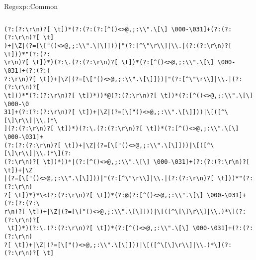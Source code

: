 \documentclass[14pt]{beamer}
\begin{document}
\begin{frame}[fragile]
    Regexp::Common
    \lstset{language=Perl}
    \begin{lstlisting}
    \end{lstlisting}
\end{frame}

\begin{frame}[fragile]
    \lstset{basicstyle=\tiny,language=Perl}
    \begin{lstlisting}
(?:(?:\r\n)?[ \t])*(?:(?:(?:[^()<>@,;:\\".\[\] \000-\031]+(?:(?:(?:\r\n)?[ \t]
)+|\Z|(?=[\["()<>@,;:\\".\[\]]))|"(?:[^\"\r\\]|\\.|(?:(?:\r\n)?[ \t]))*"(?:(?:
\r\n)?[ \t])*)(?:\.(?:(?:\r\n)?[ \t])*(?:[^()<>@,;:\\".\[\] \000-\031]+(?:(?:(
?:\r\n)?[ \t])+|\Z|(?=[\["()<>@,;:\\".\[\]]))|"(?:[^\"\r\\]|\\.|(?:(?:\r\n)?[ 
\t]))*"(?:(?:\r\n)?[ \t])*))*@(?:(?:\r\n)?[ \t])*(?:[^()<>@,;:\\".\[\] \000-\0
31]+(?:(?:(?:\r\n)?[ \t])+|\Z|(?=[\["()<>@,;:\\".\[\]]))|\[([^\[\]\r\\]|\\.)*\
](?:(?:\r\n)?[ \t])*)(?:\.(?:(?:\r\n)?[ \t])*(?:[^()<>@,;:\\".\[\] \000-\031]+
(?:(?:(?:\r\n)?[ \t])+|\Z|(?=[\["()<>@,;:\\".\[\]]))|\[([^\[\]\r\\]|\\.)*\](?:
(?:\r\n)?[ \t])*))*|(?:[^()<>@,;:\\".\[\] \000-\031]+(?:(?:(?:\r\n)?[ \t])+|\Z
|(?=[\["()<>@,;:\\".\[\]]))|"(?:[^\"\r\\]|\\.|(?:(?:\r\n)?[ \t]))*"(?:(?:\r\n)
?[ \t])*)*\<(?:(?:\r\n)?[ \t])*(?:@(?:[^()<>@,;:\\".\[\] \000-\031]+(?:(?:(?:\
r\n)?[ \t])+|\Z|(?=[\["()<>@,;:\\".\[\]]))|\[([^\[\]\r\\]|\\.)*\](?:(?:\r\n)?[
 \t])*)(?:\.(?:(?:\r\n)?[ \t])*(?:[^()<>@,;:\\".\[\] \000-\031]+(?:(?:(?:\r\n)
?[ \t])+|\Z|(?=[\["()<>@,;:\\".\[\]]))|\[([^\[\]\r\\]|\\.)*\](?:(?:\r\n)?[ \t]

\end{lstlisting}
\end{frame}
\end{document}
